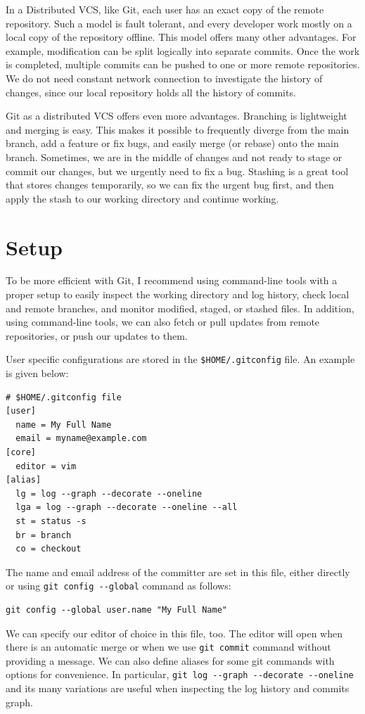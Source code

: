 \documentclass[11pt]{article}
\begin{document}
In a Distributed VCS, like Git, each user has an exact copy of the remote repository. Such a model is fault tolerant, and every developer work mostly on a local copy of the repository offline. This model offers many other advantages. For example, modification can be split logically into separate commits. Once the work is completed, multiple commits can be pushed to one or more remote repositories. We do not need constant network connection to investigate the history of changes, since our local repository holds all the history of commits.

Git as a distributed VCS offers even more advantages. Branching is lightweight and merging is easy. This makes it possible to frequently diverge from the main branch, add a feature or fix bugs, and easily merge (or rebase) onto the main branch. Sometimes, we are in the middle of changes and not ready to stage or commit our changes, but we urgently need to fix a bug. Stashing is a great tool that stores changes temporarily, so we can fix the urgent bug first, and then apply the stash to our working directory and continue working.

\section{\label{orgtarget1} Setup}
\label{sec:orgheadline3}
To be more efficient with Git, I recommend using command-line tools with a proper setup to easily inspect the working directory and log history, check local and remote branches, and monitor modified, staged, or stashed files. In addition, using command-line tools, we can also fetch or pull updates from remote repositories, or push our updates to them.

User specific configurations are stored in the \texttt{\$HOME/.gitconfig} file. An example is given below:
\begin{verbatim}
# $HOME/.gitconfig file
[user]
  name = My Full Name
  email = myname@example.com
[core]
  editor = vim
[alias]
  lg = log --graph --decorate --oneline
  lga = log --graph --decorate --oneline --all
  st = status -s
  br = branch
  co = checkout
\end{verbatim}
The name and email address of the committer are set in this file, either directly or using \texttt{git config -{}-global} command as follows:
\begin{verbatim}
git config --global user.name "My Full Name"
\end{verbatim}
We can specify our editor of choice in this file, too. The editor will open when there is an automatic merge or when we use \texttt{git commit} command without providing a message. We can also define aliases for some git commands with options for convenience. In particular, \texttt{git log -{}-graph -{}-decorate -{}-oneline} and its many variations are useful when inspecting the log history and commits graph.
\end{document}
